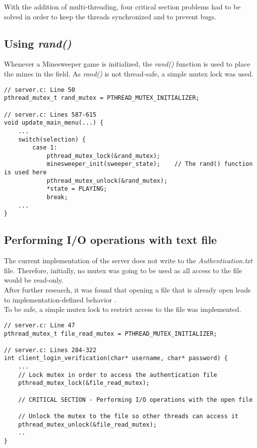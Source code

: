 With the addition of multi-threading, four critical section problems had to be solved in order to keep the threads synchronized and to prevent bugs.
\subsection{Using \textit{rand()}}
Whenever a Minesweeper game is initialized, the \textit{rand()} function is used to place the mines in the field. As \textit{rand()} is not thread-safe, a simple mutex lock was used.
\begin{lstlisting}[style=CStyle]
// server.c: Line 50
pthread_mutex_t rand_mutex = PTHREAD_MUTEX_INITIALIZER;

// server.c: Lines 587-615
void update_main_menu(...) {
	...
	switch(selection) {
		case 1:
			pthread_mutex_lock(&rand_mutex);
			minesweeper_init(sweeper_state);	// The rand() function is used here
			pthread_mutex_unlock(&rand_mutex);
			*state = PLAYING;
			break;
	...
}
\end{lstlisting}

\subsection{Performing I/O operations with text file}
The current implementation of the server does not write to the \textit{Authentication.txt} file. Therefore, initially, no mutex was going to be used as all access to the file would be read-only.
\\
After further research, it was found that opening a file that is already open leads to implementation-defined behavior \cite{fopen}.
\\
To be safe, a simple mutex lock to restrict access to the file was implemented.
\begin{lstlisting}[style=CStyle]
// server.c: Line 47
pthread_mutex_t file_read_mutex = PTHREAD_MUTEX_INITIALIZER;

// server.c: Lines 284-322
int client_login_verification(char* username, char* password) {
	...
	// Lock mutex in order to access the authentication file
	pthread_mutex_lock(&file_read_mutex);
	
	// CRITICAL SECTION - Performing I/O operations with the open file
	
	// Unlock the mutex to the file so other threads can access it 
	pthread_mutex_unlock(&file_read_mutex);
	..
}
\end{lstlisting}

